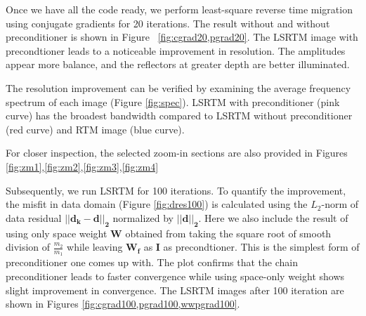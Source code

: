 
Once we have all the code ready, we perform least-square reverse time migration using conjugate gradients for 20 iterations. The result without and without preconditioner is shown in Figure ~\ref{fig:cgrad20,pgrad20}. The LSRTM image with precondtioner leads to a noticeable improvement in resolution. The amplitudes appear more balance, and the reflectors at greater depth are better illuminated. 


%

The resolution improvement can be verified by examining the average frequency spectrum of each image (Figure \ref{fig:spec}). LSRTM with preconditioner (pink curve) has the broadest bandwidth compared to LSRTM without preconditioner (red curve) and RTM image (blue curve). 



%

For closer inspection, the selected zoom-in sections are also provided in Figures \ref{fig:zm1},\ref{fig:zm2},\ref{fig:zm3},\ref{fig:zm4}


%

Subsequently, we run LSRTM for 100 iterations. To quantify the improvement, the misfit in data domain (Figure \ref{fig:dres100}) is calculated using the $L_2$-norm of data residual $\mathbf{|| d_k - d ||_{2}}$ normalized by $\mathbf{||d ||_{2}}$. Here we also include the result of using only space weight $\mathbf{W}$ obtained from taking the square root of smooth division of $\frac{m_2}{m_1}$ while leaving $\mathbf{W_f}$ as $\mathbf{I}$ as precondtioner. This is the simplest form of preconditioner one comes up with.
The plot confirms that the chain preconditioner leads to faster convergence while using space-only weight shows slight improvement in convergence. The LSRTM images after 100 iteration are shown in Figures \ref{fig:cgrad100,pgrad100,wwpgrad100}. 

